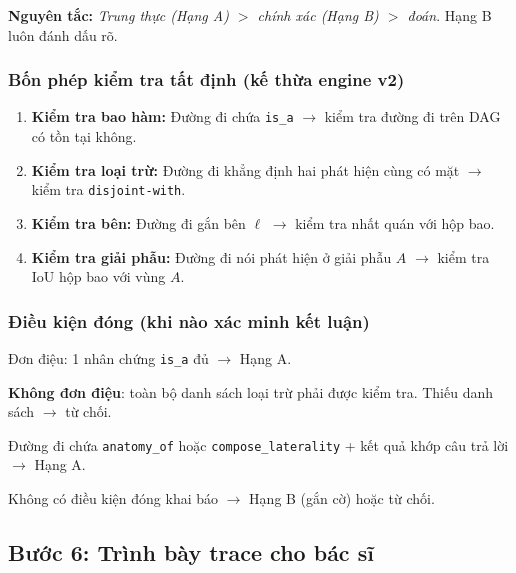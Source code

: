 \documentclass[11pt,a4paper]{article}
\begin{document}
\textbf{Nguyên tắc:} \emph{Trung thực (Hạng A) $>$ chính xác (Hạng B) $>$ đoán}. Hạng B luôn đánh dấu rõ.

\subsubsection{Bốn phép kiểm tra tất định (kế thừa engine v2)}

\begin{enumerate}[leftmargin=1.5em]
  \item \textbf{Kiểm tra bao hàm:} Đường đi chứa \texttt{is\_a} $\to$ kiểm tra đường đi trên DAG có tồn tại không.
  \item \textbf{Kiểm tra loại trừ:} Đường đi khẳng định hai phát hiện cùng có mặt $\to$ kiểm tra \texttt{disjoint-with}.
  \item \textbf{Kiểm tra bên:} Đường đi gắn bên $\ell$ $\to$ kiểm tra nhất quán với hộp bao.
  \item \textbf{Kiểm tra giải phẫu:} Đường đi nói phát hiện ở giải phẫu $A$ $\to$ kiểm tra IoU hộp bao với vùng $A$.
\end{enumerate}

\subsubsection{Điều kiện đóng (khi nào xác minh kết luận)}

\begin{description}[leftmargin=1.5em, style=nextline]
  \item[Tồn tại ($\exists$)]
  Đơn điệu: 1 nhân chứng \texttt{is\_a} đủ $\to$ Hạng A.

  \item[Phủ định ($\neg\exists$)]
  \textbf{Không đơn điệu}: toàn bộ danh sách loại trừ phải được kiểm tra. Thiếu danh sách $\to$ từ chối.

  \item[Quan hệ / đếm]
  Đường đi chứa \texttt{anatomy\_of} hoặc \texttt{compose\_laterality} + kết quả khớp câu trả lời $\to$ Hạng A.

  \item[Mở]
  Không có điều kiện đóng khai báo $\to$ Hạng B (gắn cờ) hoặc từ chối.
\end{description}


\subsection{Bước 6: Trình bày trace cho bác sĩ}
\end{document}
